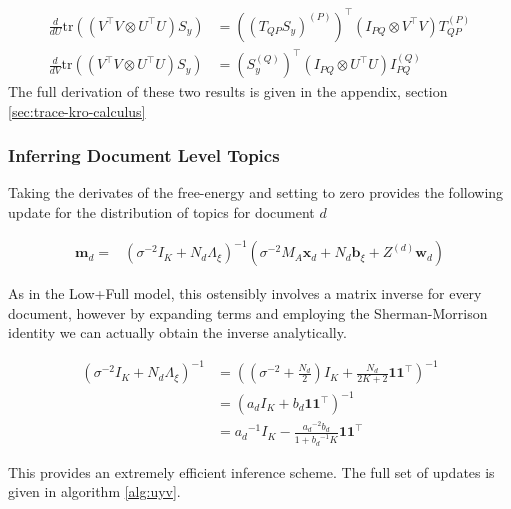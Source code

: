 \documentclass[10pt,fleqn]{article}
\newcommand \halve[1] {
	\frac{#1}{2}
}
\newcommand \tr { \text{tr} }
\newcommand \T { ^\top }
\newcommand \vv[1] { \bm #1 }
\newcommand \Axi { { \Lambda_{\xi} } }
\newcommand \bxi { { \vv{b}_{\xi} } }
\newcommand \xd      { { \vv x_d } }
\newcommand \Tr[1]   { \tr \left(  {#1}  \right) }
\newcommand \inv[1] { {#1}^{-1} }
\newcommand \invb[1] { \inv{\left( #1 \right)} }
\newcommand \vt[2] { { #1^{(#2)} } }
\newcommand \mvy  { \vv{m}_{\vv{y}} }
\newcommand \sigvy { { S_Y } }
\newcommand \mmy  { M_Y      }
\newcommand \md   { \vv{m}_d }
\newcommand \sigy { { \Sigma_Y } }
\newcommand \omy  { { \Omega_Y } }
\begin{document}
\begin{align}
\frac{d}{dU} \Tr{(V\T V \otimes U\T U)S_y} 
& = \left( \vt{(T_{QP} S_y)}{P} \right)\T (I_{PQ} \otimes V\T V)\vt{T_{QP}}{P}
\\
\frac{d}{dV} \Tr{(V\T V \otimes U\T U)S_y} 
& = \left(\vt{S_y}{Q}\right)\T (I_{PQ} \otimes U\T U) \vt{I_{PQ}}{Q}
\end{align}
The full derivation of these two results is given in the appendix, section \ref{sec:trace-kro-calculus}


\subsubsection{Inferring Document Level Topics}
Taking the derivates of the free-energy and setting to zero provides the following update for the distribution of topics for document $d$

\begin{align}
\md = & \invb{\sigma^{-2}I_K + N_d \Axi} \left(\sigma^{-2} M_A \xd  + N_d \bxi + Z^{(d)}\vv{w}_d \right )
\end{align}

As in the Low+Full model, this ostensibly involves a matrix inverse for every document, however by expanding terms and employing the Sherman-Morrison identity we can actually obtain the inverse analytically.

\begin{align}
\invb{\sigma^{-2}I_K + N_d \Axi}
& = \invb{(\sigma^{-2} + \halve{N_d})I_K + \frac{N_d}{2K + 2} \mathbf{1} \mathbf{1}\T} \\
& = \invb{a_d I_K + b_d \mathbf{1}\mathbf{1}\T} \\
& = \inv{a_d} I_K - \frac{{a_d}^{-2}b_d }{1 + \inv{b_d}K}\mathbf{1}\mathbf{1}\T
\end{align}

This provides an extremely efficient inference scheme. The full set of updates is given in algorithm \ref{alg:uyv}.

\newcommand \mvy  { \vv{m}_{\vv{y}} }
\newcommand \sigvy { { S_Y } }

\newcommand \mmy  { M_Y      }
\newcommand \omy  { \Omega_Y }
\newcommand \sigy { \Sigma_Y }
\end{document}
